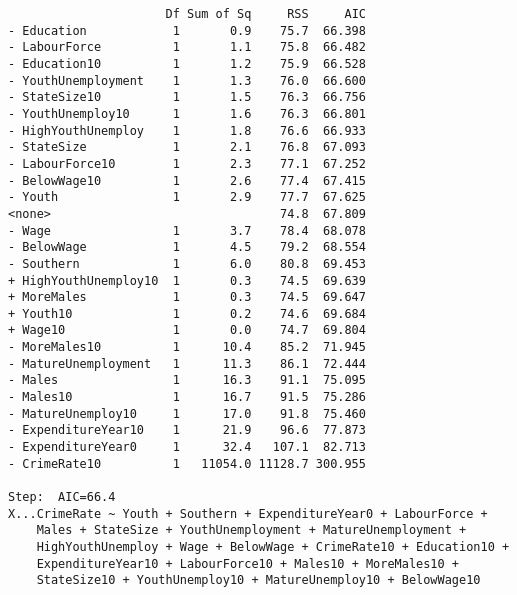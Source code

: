 \documentclass[11pt]{article}
\begin{document}
\begin{enumerate}
\begin{verbatim}
                      Df Sum of Sq     RSS     AIC
- Education            1       0.9    75.7  66.398
- LabourForce          1       1.1    75.8  66.482
- Education10          1       1.2    75.9  66.528
- YouthUnemployment    1       1.3    76.0  66.600
- StateSize10          1       1.5    76.3  66.756
- YouthUnemploy10      1       1.6    76.3  66.801
- HighYouthUnemploy    1       1.8    76.6  66.933
- StateSize            1       2.1    76.8  67.093
- LabourForce10        1       2.3    77.1  67.252
- BelowWage10          1       2.6    77.4  67.415
- Youth                1       2.9    77.7  67.625
<none>                                74.8  67.809
- Wage                 1       3.7    78.4  68.078
- BelowWage            1       4.5    79.2  68.554
- Southern             1       6.0    80.8  69.453
+ HighYouthUnemploy10  1       0.3    74.5  69.639
+ MoreMales            1       0.3    74.5  69.647
+ Youth10              1       0.2    74.6  69.684
+ Wage10               1       0.0    74.7  69.804
- MoreMales10          1      10.4    85.2  71.945
- MatureUnemployment   1      11.3    86.1  72.444
- Males                1      16.3    91.1  75.095
- Males10              1      16.7    91.5  75.286
- MatureUnemploy10     1      17.0    91.8  75.460
- ExpenditureYear10    1      21.9    96.6  77.873
- ExpenditureYear0     1      32.4   107.1  82.713
- CrimeRate10          1   11054.0 11128.7 300.955

Step:  AIC=66.4
X...CrimeRate ~ Youth + Southern + ExpenditureYear0 + LabourForce + 
    Males + StateSize + YouthUnemployment + MatureUnemployment + 
    HighYouthUnemploy + Wage + BelowWage + CrimeRate10 + Education10 + 
    ExpenditureYear10 + LabourForce10 + Males10 + MoreMales10 + 
    StateSize10 + YouthUnemploy10 + MatureUnemploy10 + BelowWage10


\end{verbatim}
\end{enumerate}
\end{document}
